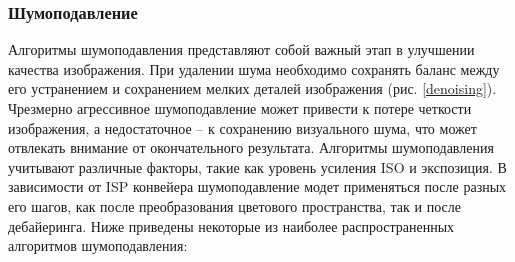 \subsubsection{Шумоподавление}


Алгоритмы шумоподавления \cite{lib-denoising} представляют собой важный этап в улучшении качества изображения. При удалении шума необходимо сохранять баланс между его устранением и сохранением мелких деталей изображения (рис. \ref{denoising}). Чрезмерно агрессивное шумоподавление может привести к потере четкости изображения, а недостаточное – к сохранению визуального шума, что может отвлекать внимание от окончательного результата. Алгоритмы шумоподавления учитывают различные факторы, такие как уровень усиления ISO и экспозиция. В зависимости от ISP конвейера шумоподавление модет применяться после разных его шагов, как после преобразования цветового пространства, так и после дебайеринга. Ниже приведены некоторые из наиболее распространенных алгоритмов шумоподавления:

